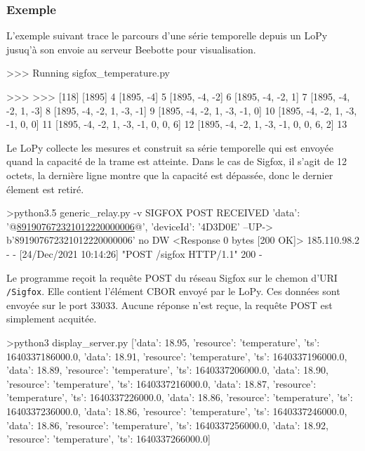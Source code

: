  \subsubsection{Exemple}
 
L'exemple suivant trace le parcours d'une série temporelle depuis un LoPy jusuq'à son envoie au serveur Beebotte pour visualisation.

\begin{termc}[backgroundcolor=\color{blue!10}, basicstyle=\ttfamily\small, escapechar=@] 
>>> Running sigfox_temperature.py

>>>
>>>
[118]
[1895] 4
[1895, -4] 5
[1895, -4, -2] 6
[1895, -4, -2, 1] 7
[1895, -4, -2, 1, -3] 8
[1895, -4, -2, 1, -3, -1] 9
[1895, -4, -2, 1, -3, -1, 0] 10
[1895, -4, -2, 1, -3, -1, 0, 0] 11
[1895, -4, -2, 1, -3, -1, 0, 0, 6] 12
[1895, -4, -2, 1, -3, -1, 0, 0, 6, 2] 13
\end{termc}

Le LoPy collecte les mesures et construit sa série temporelle qui est envoyée quand la capacité de la trame est atteinte. Dans le cas de Sigfox, il s'agit de 12 octets, la dernière ligne montre que la capacité est dépassée, donc le dernier élement est retiré.

\begin{termc}[backgroundcolor=\color{palerod}, basicstyle=\ttfamily\small, escapechar=@] 
 >python3.5 generic_relay.py -v
SIGFOX POST RECEIVED
{'data': '@\ul{891907672321012220000006}@', 'deviceId': '4D3D0E'}
--UP-> b'891907672321012220000006'
no DW
<Response 0 bytes [200 OK]>
185.110.98.2 - - [24/Dec/2021 10:14:26] "POST /sigfox HTTP/1.1" 200 -
\end{termc}

Le programme  reçoit la requête POST du réseau Sigfox sur le chemon d'URI \texttt{/Sigfox}. Elle contient l'élément CBOR envoyé par le LoPy. Ces données sont envoyée sur le port 33033. Aucune réponse n'est reçue, la requête POST est simplement acquitée.


\begin{termc}[backgroundcolor=\color{palerod}, basicstyle=\ttfamily\small, escapechar=@] 
 >python3 display_server.py
[{'data': 18.95, 'resource': 'temperature', 'ts': 1640337186000.0},
 {'data': 18.91, 'resource': 'temperature', 'ts': 1640337196000.0},
 {'data': 18.89, 'resource': 'temperature', 'ts': 1640337206000.0},
 {'data': 18.90, 'resource': 'temperature', 'ts': 1640337216000.0},
 {'data': 18.87, 'resource': 'temperature', 'ts': 1640337226000.0},
 {'data': 18.86, 'resource': 'temperature', 'ts': 1640337236000.0},
 {'data': 18.86, 'resource': 'temperature', 'ts': 1640337246000.0},
 {'data': 18.86, 'resource': 'temperature', 'ts': 1640337256000.0},
 {'data': 18.92, 'resource': 'temperature', 'ts': 1640337266000.0}]
\end{termc}

